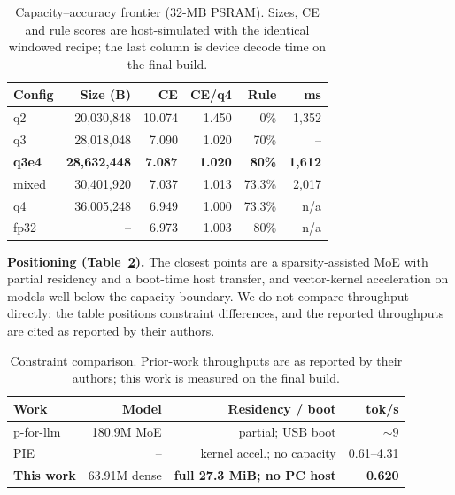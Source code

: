 \documentclass[journal,letterpaper]{IEEEtran}
\begin{document}
\begin{table}[t]
\centering
\caption{Capacity--accuracy frontier (32-MB PSRAM). Sizes, CE and rule scores are host-simulated with the identical windowed recipe; the last column is device decode time on the final build.}
\label{tab:frontier}
\footnotesize
\setlength{\tabcolsep}{2.5pt}
\begin{tabular}{@{}lrrrrr@{}}
\toprule
Config & Size (B) & CE & CE/q4 & Rule & ms \\
\midrule
q2 & 20,030,848 & 10.074 & 1.450 & 0\% & 1,352 \\
q3 & 28,018,048 & 7.090 & 1.020 & 70\% & -- \\
\textbf{q3e4} & \textbf{28,632,448} & \textbf{7.087} & \textbf{1.020} & \textbf{80\%} & \textbf{1,612} \\
mixed & 30,401,920 & 7.037 & 1.013 & 73.3\% & 2,017 \\
q4 & 36,005,248 & 6.949 & 1.000 & 73.3\% & n/a \\
fp32 & -- & 6.973 & 1.003 & 80\% & n/a \\
\bottomrule
\end{tabular}
\end{table}



\textbf{Positioning (Table~\ref{tab:compare}).} The closest points are a sparsity-assisted MoE
with partial residency and a boot-time host transfer, and vector-kernel acceleration on models
well below the capacity boundary. We do not compare throughput directly: the table positions
constraint differences, and the reported throughputs are cited as reported by their authors.

\begin{table}[t]
\centering
\caption{Constraint comparison. Prior-work throughputs are as reported by their authors; this work is measured on the final build.}
\label{tab:compare}
\footnotesize
\setlength{\tabcolsep}{2.5pt}
\begin{tabular}{@{}lrrr@{}}
\toprule
Work & Model & Residency / boot & tok/s \\
\midrule
p-for-llm & 180.9M MoE & partial; USB boot & $\sim$9 \\
PIE & -- & kernel accel.; no capacity & 0.61--4.31 \\
\textbf{This work} & 63.91M dense & \textbf{full 27.3 MiB; no PC host} & \textbf{0.620} \\
\bottomrule
\end{tabular}
\end{table}
\end{document}

